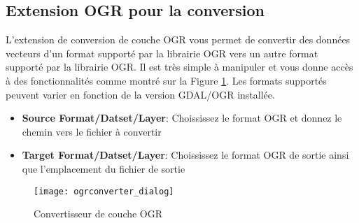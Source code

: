 
\subsection{Extension OGR pour la conversion}

L'extension de conversion de couche OGR vous permet de convertir des donn\'ees vecteurs d'un format support\'e par la librairie OGR
vers un autre format support\'e par la librairie OGR. Il est tr\`es simple \`a manipuler et vous donne acc\`es \`a des fonctionnalit\'es
comme montr\'e sur la Figure \ref{fig:ogrconverter_dialog}. Les formats support\'es peuvent varier en fonction de la version GDAL/OGR install\'ee.


\begin{itemize}
\item \textbf{Source Format/Datset/Layer}: Choississez le format OGR et donnez le chemin vers le fichier \`a convertir
\item \textbf{Target Format/Datset/Layer}: Choississez le format OGR de sortie ainsi que l'emplacement du fichier de sortie
\end{itemize}

\begin{figure}[ht]
   \begin{center}
   \caption{Convertisseur de couche OGR \nixcaption}\label{fig:ogrconverter_dialog}\smallskip
   \texttt{[image: ogrconverter\_dialog]}
\end{center}  
\end{figure}

